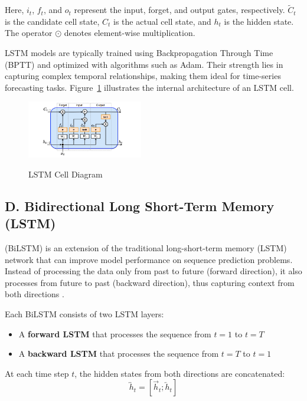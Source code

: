 \documentclass[final,numbered]{ifacconf}
\begin{document}
Here, $i_t$, $f_t$, and $o_t$ represent the input, forget, and output gates, respectively. $\tilde{C}_t$ is the candidate cell state, $C_t$ is the actual cell state, and $h_t$ is the hidden state. The operator $\odot$ denotes element-wise multiplication.

LSTM models are typically trained using Backpropagation Through Time (BPTT) and optimized with algorithms such as Adam. Their strength lies in capturing complex temporal relationships, making them ideal for time-series forecasting tasks. Figure~\ref{fig:lstm} illustrates the internal architecture of an LSTM cell.\cite{hochreiter1997long}

\begin{figure}[h]
  \centering
  \includegraphics[width=0.45\textwidth]{lstm.png}
  \caption{LSTM Cell Diagram}
  \label{fig:lstm}
  \cite{hochreiter1997long}
\end{figure}

\subsection{D. Bidirectional Long Short-Term Memory (LSTM)}
(BiLSTM) is an extension of the traditional long-short-term memory (LSTM) network that can improve model performance on sequence prediction problems. Instead of processing the data only from past to future (forward direction), it also processes from future to past (backward direction), thus capturing context from both directions \cite{schuster1997bidirectional}.

\vspace{1em}
Each BiLSTM consists of two LSTM layers:
\begin{itemize}
    \item A \textbf{forward LSTM} that processes the sequence from $t = 1$ to $t = T$
    \item A \textbf{backward LSTM} that processes the sequence from $t = T$ to $t = 1$
\end{itemize}

At each time step $t$, the hidden states from both directions are concatenated:
\[
\overleftrightarrow{h}_t = [\overrightarrow{h}_t; \overleftarrow{h}_t]
\]
\end{document}
